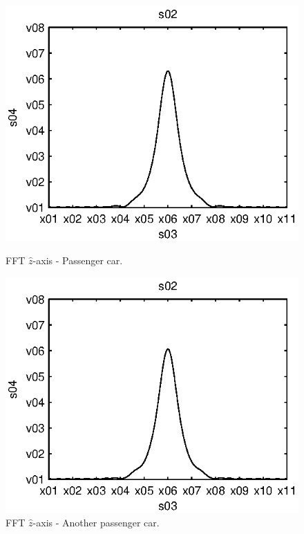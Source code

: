 
\begin{subfigures}
\begin{figure}[tfhb]
 \centering
 \begin{minipage}{0.45\linewidth}
 	\centering
 	
	\includegraphics[width=1\linewidth]{images/fft-car-z}
  	\caption[FFT $\hat{z}$-axis - Passenger car]{FFT $\hat{z}$-axis - Passenger car.\\}
  	\label{fig:fft-car-z} 
 \end{minipage} \hfill
 \begin{minipage}{0.45\linewidth}
 	\centering
  	
	\includegraphics[width=1\linewidth]{images/fft-car3-z}
  	\caption[FFT $\hat{z}$-axis - Another passenger car]{FFT $\hat{z}$-axis - Another passenger car.}
  	\label{fig:fft-car3-z} 
 \end{minipage}
   

\end{figure}
\end{subfigures}
